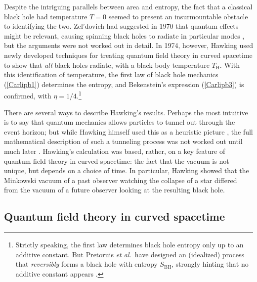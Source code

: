 \documentclass[11pt]{article}
\begin{document}
Despite the intriguing parallels between area and entropy, the fact
that a classical black hole had temperature $T=0$ seemed to present an 
insurmountable obstacle to identifying the two.  Zel'dovich had suggested 
in 1970 that quantum effects might be relevant, causing
spinning black holes to radiate in particular modes \cite{Zeldovich}, 
but the arguments were not worked out in detail.  In 1974, however, 
Hawking \cite{Hawking,Hawkingc} used newly developed techniques
 for treating quantum field  theory in curved spacetime \cite{Parker} 
to show that \emph{all} black holes radiate, with
a black body temperature $T_{\scriptscriptstyle\mathrm{H}}$.  With this
identification of temperature, the first law of black hole mechanics
(\ref{Carlipb1}) determines the entropy, and
Bekenstein's expression (\ref{Carlipb3}) is confirmed, with
$\eta=1/4$.\footnote{Strictly speaking, the first law determines 
black hole entropy only up to an additive constant. But Pretoruis
{\it et al.}\ have designed an (idealized) process that \emph{reversibly} 
forms a black hole with entropy $S_{\scriptscriptstyle\mathrm{BH}}$, 
strongly hinting that no additive constant appears \cite{Pretorius}.}

There are several ways to describe Hawking's results.  Perhaps the most
intuitive is to say that quantum mechanics allows particles to tunnel out
through the event horizon; but while Hawking himself used this as
a heuristic picture \cite{Hawkingc}, the full mathematical
description of such a tunneling process was not worked out until much 
later \cite{Parikh}.  Hawking's calculation was based, rather, on a key
feature of quantum field theory in curved spacetime: the fact that the vacuum
is not unique, but depends on a choice of time.  In particular, Hawking
showed that the Minkowski vacuum of a past observer watching the 
collapse of a star differed from the vacuum of a future observer looking
at the resulting black hole.

\subsection{Quantum field theory in curved spacetime}
\end{document}
